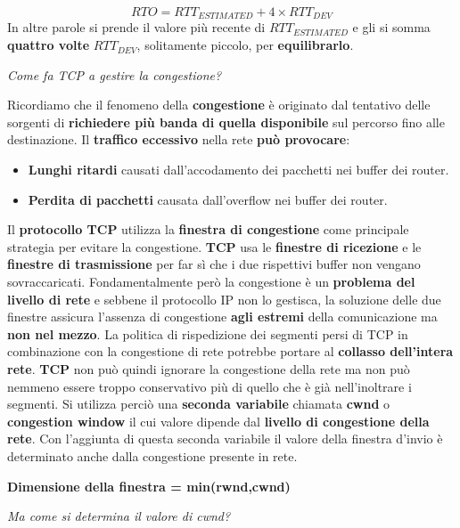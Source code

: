 \documentclass[11pt,a4paper]{article}
\theoremstyle{definition}
\begin{document}
\begin{equation}
	RTO = RTT_{ESTIMATED} + 4 \times RTT_{DEV}
\end{equation}
In altre parole si prende il valore più recente di $RTT_{ESTIMATED}$ e gli si somma \textbf{quattro volte} $RTT_{DEV}$, solitamente piccolo, per \textbf{equilibrarlo}.
\newpage
\begin{flushleft}
	\textit{Come fa TCP a gestire la congestione?}
\end{flushleft}
Ricordiamo che il fenomeno della \textbf{congestione} è originato dal tentativo delle
sorgenti di \textbf{richiedere più banda di quella disponibile} sul percorso fino alle destinazione.\newline
Il \textbf{traffico eccessivo} nella rete \textbf{può provocare}:
\begin{itemize}
	\item \textbf{Lunghi ritardi} causati dall'accodamento dei pacchetti nei buffer dei router.
	\item \textbf{Perdita di pacchetti} causata dall'overflow nei buffer dei router.
\end{itemize}
Il \textbf{protocollo TCP} utilizza la \textbf{finestra di congestione} come principale strategia per evitare la congestione.\newline\newline
\textbf{TCP} usa le \textbf{finestre di ricezione} e le \textbf{finestre di trasmissione} per far sì che i due rispettivi buffer non vengano sovraccaricati. Fondamentalmente però la congestione è un \textbf{problema del livello di rete} e sebbene il protocollo IP non lo gestisca, la soluzione delle due finestre assicura l'assenza di congestione \textbf{agli estremi} della comunicazione ma \textbf{non nel mezzo}. La politica di rispedizione dei segmenti persi di TCP in combinazione con la congestione di rete potrebbe portare al \textbf{collasso dell'intera rete}.
\textbf{TCP} non può quindi ignorare la congestione della rete ma non può nemmeno essere troppo conservativo più di quello che è già nell'inoltrare i segmenti. Si utilizza perciò una \textbf{seconda variabile} chiamata \textbf{cwnd} o \textbf{congestion window} il cui valore dipende dal \textbf{livello di congestione della rete}. Con l'aggiunta di questa seconda variabile il valore della finestra d'invio è determinato anche dalla congestione presente in rete.
\begin{center}
	\textbf{Dimensione della finestra = min(rwnd,cwnd)}
\end{center}
\begin{flushleft}
	\textit{Ma come si determina il valore di cwnd?}
\end{flushleft}
\end{document}
